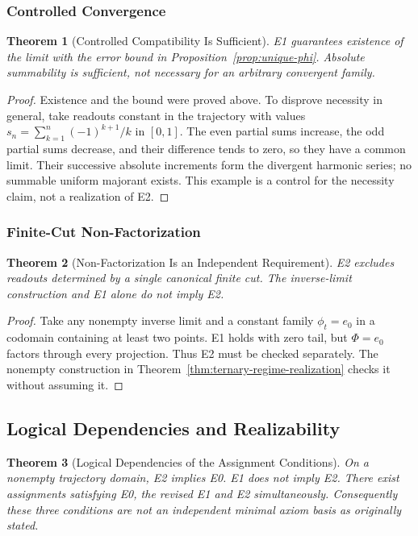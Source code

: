\documentclass[11pt,a4paper]{article}
\theoremstyle{plain}
\newtheorem{theorem}{Theorem}[section]
\theoremstyle{definition}
\theoremstyle{remark}
\begin{document}
\subsubsection{Controlled Convergence}

\begin{theorem}[Controlled Compatibility Is Sufficient]\label{thm:e1-necessary}
E1 guarantees existence of the limit with the error bound in Proposition~\ref{prop:unique-phi}. Absolute summability is sufficient, not necessary for an arbitrary convergent family.
\end{theorem}

\begin{proof}
Existence and the bound were proved above. To disprove necessity in general, take readouts constant in the trajectory with values $s_n=\sum_{k=1}^{n}(-1)^{k+1}/k$ in $[0,1]$. The even partial sums increase, the odd partial sums decrease, and their difference tends to zero, so they have a common limit. Their successive absolute increments form the divergent harmonic series; no summable uniform majorant exists. This example is a control for the necessity claim, not a realization of E2.
\end{proof}

\subsubsection{Finite-Cut Non-Factorization}

\begin{theorem}[Non-Factorization Is an Independent Requirement]\label{thm:e2-necessary}
E2 excludes readouts determined by a single canonical finite cut. The inverse-limit construction and E1 alone do not imply E2.
\end{theorem}

\begin{proof}
Take any nonempty inverse limit and a constant family $\phi_t=e_0$ in a codomain containing at least two points. E1 holds with zero tail, but $\Phi=e_0$ factors through every projection. Thus E2 must be checked separately. The nonempty construction in Theorem~\ref{thm:ternary-regime-realization} checks it without assuming it.
\end{proof}

\subsection{Logical Dependencies and Realizability}

\begin{theorem}[Logical Dependencies of the Assignment Conditions]\label{thm:minimality}
On a nonempty trajectory domain, E2 implies E0. E1 does not imply E2. There exist assignments satisfying E0, the revised E1 and E2 simultaneously. Consequently these three conditions are not an independent minimal axiom basis as originally stated.
\end{theorem}
\end{document}
